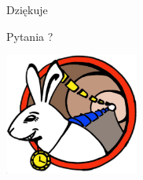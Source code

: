 \documentclass[compress,red]{beamer}
\begin{document}
\begin{frame}{Dziękuje}

    \begin{center}
    Pytania ?
    \end{center}

    
    \begin{center}
    \includegraphics[height=4.0cm]{logo/WRlogo.pdf}
    \end{center}

\end{frame}
\end{document}
